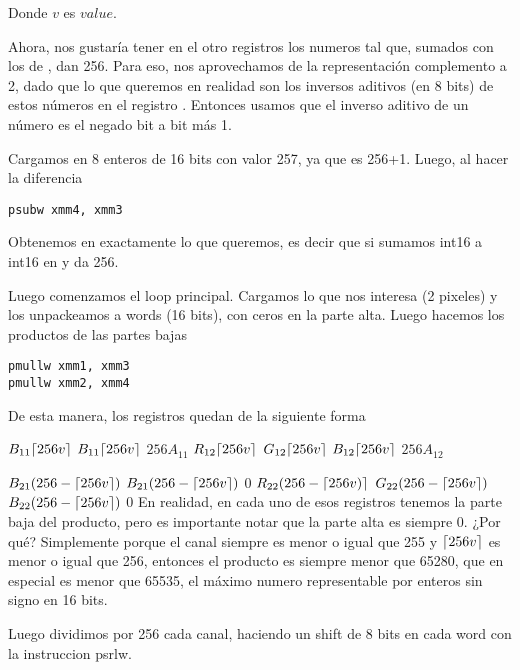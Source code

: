 

Donde $v$ es $value$.


Ahora, nos gustaría tener en el otro registros los numeros tal que, sumados con los de , dan 256. Para eso, nos aprovechamos de la representación complemento a 2, dado que lo que queremos en realidad son los inversos aditivos (en 8 bits) de estos números en el registro . Entonces usamos que el inverso aditivo de un número es el negado bit a bit más 1.

Cargamos en  8 enteros de 16 bits con valor 257, ya que es 256+1.
Luego, al hacer la diferencia

\begin{lstlisting}
psubw xmm4, xmm3
\end{lstlisting}

Obtenemos en  exactamente lo que queremos, es decir que si sumamos int16 a int16 en  y  da 256.


Luego comenzamos el loop principal. Cargamos lo que nos interesa (2 pixeles) y los unpackeamos a words (16 bits), con ceros en la parte alta. Luego hacemos los productos de las partes bajas

\begin{lstlisting}
pmullw xmm1, xmm3
pmullw xmm2, xmm4 
\end{lstlisting}

De esta manera, los registros quedan de la siguiente forma

 {$B_{11}\lceil256v\rceil$} {$B_{11}\lceil256v\rceil$} {$256A_{11}$} {$R_{12}\lceil256v\rceil$} {$G_{12}\lceil256v\rceil$} {$B_{12}\lceil256v\rceil$} {$256A_{12}$}


\scriptsize{
 {$B_{21}(256-\lceil256v\rceil)$} {$B_{21}(256-\lceil256v\rceil)$} {$0$} {$R_{22}(256-\lceil256v)\rceil$} {$G_{22}(256-\lceil256v\rceil)$} {$B_{22}(256-\lceil256v\rceil)$} {$0$}
}
\normalsize
En realidad, en cada uno de esos registros tenemos la parte baja del producto, pero es importante notar que la parte alta es siempre 0. ¿Por qué? Simplemente porque el canal siempre es menor o igual que 255 y $\lceil256v\rceil$ es menor o igual que 256, entonces el producto es siempre menor que 65280, que en especial es menor que 65535, el máximo numero representable por enteros sin signo en 16 bits.

Luego dividimos por 256 cada canal, haciendo un shift de 8 bits en cada word con la instruccion psrlw.

